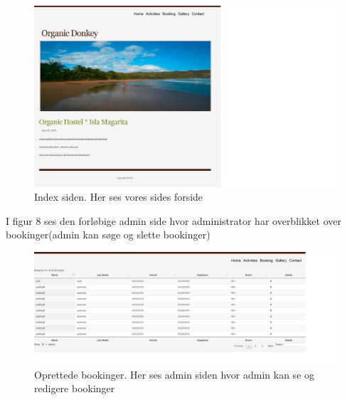 \documentclass[12pt,a4paper]{article}
\begin{document}
\begin{figure}[H]
\centering
\includegraphics[scale=0.6] {brugergransefladebilled2.jpg}
\caption{Index siden. Her ses vores sides forside} 
\end{figure}
\newpage
I figur 8 ses den forløbige admin side hvor administrator har overblikket
over bookinger(admin kan søge og slette bookinger) 
\begin{figure}[H]
\centering
\includegraphics[scale=0.4] {brugergransefladebilled3.jpg}
\caption{Oprettede bookinger. Her ses admin siden hvor admin kan se og redigere bookinger}
\end{figure}
\end{document}
